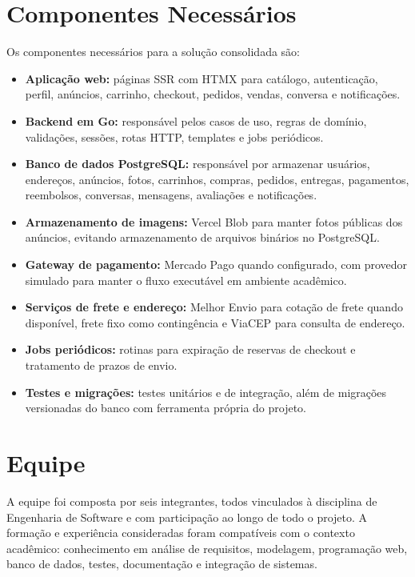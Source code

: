 ﻿\documentclass[12pt,a4paper]{article}
\begin{document}
\section{Componentes Necessários}
Os componentes necessários para a solução consolidada são:

\begin{itemize}
    \item \textbf{Aplicação web:} páginas SSR com HTMX para catálogo, autenticação, perfil, anúncios, carrinho, checkout, pedidos, vendas, conversa e notificações.

    \item \textbf{Backend em Go:} responsável pelos casos de uso, regras de domínio, validações, sessões, rotas HTTP, templates e jobs periódicos.

    \item \textbf{Banco de dados PostgreSQL:} responsável por armazenar usuários, endereços, anúncios, fotos, carrinhos, compras, pedidos, entregas, pagamentos, reembolsos, conversas, mensagens, avaliações e notificações.

    \item \textbf{Armazenamento de imagens:} Vercel Blob para manter fotos públicas dos anúncios, evitando armazenamento de arquivos binários no PostgreSQL.

    \item \textbf{Gateway de pagamento:} Mercado Pago quando configurado, com provedor simulado para manter o fluxo executável em ambiente acadêmico.

    \item \textbf{Serviços de frete e endereço:} Melhor Envio para cotação de frete quando disponível, frete fixo como contingência e ViaCEP para consulta de endereço.

    \item \textbf{Jobs periódicos:} rotinas para expiração de reservas de checkout e tratamento de prazos de envio.

    \item \textbf{Testes e migrações:} testes unitários e de integração, além de migrações versionadas do banco com ferramenta própria do projeto.
\end{itemize}

\section{Equipe}
A equipe foi composta por seis integrantes, todos vinculados à disciplina de Engenharia de Software e com participação ao longo de todo o projeto. A formação e experiência consideradas foram compatíveis com o contexto acadêmico: conhecimento em análise de requisitos, modelagem, programação web, banco de dados, testes, documentação e integração de sistemas.
\end{document}
